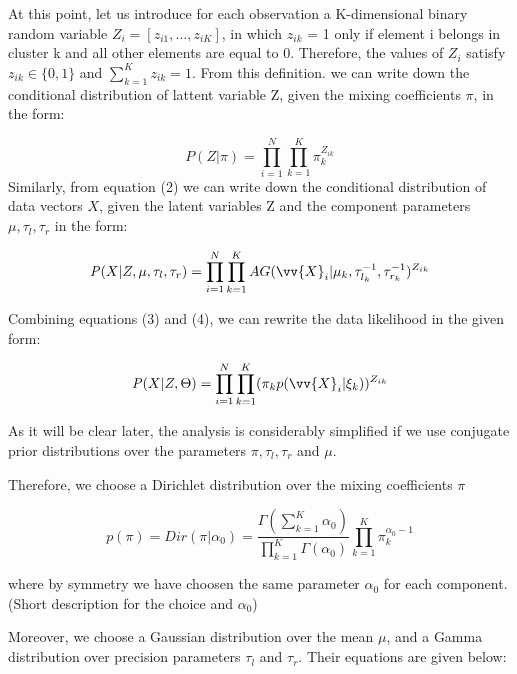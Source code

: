 \documentclass[runningheads]{llncs}
\begin{document}
At this point, let us introduce for each observation a K-dimensional binary random variable $Z_{i} = [z_{i1},\dots,z_{iK}]$,
in which $z_{ik}$ = 1 only if element i belongs in cluster k and all other elements are equal to 0. Therefore, the values of 
$Z_{i}$ satisfy $z_{ik} \in \{0, 1\}$  and $\sum_{k=1}^{K}z_{ik} = 1$. 
From this definition. we can write down the conditional distribution of lattent variable Z, given the mixing
coefficients $\pi$, in the form: 

\begin{equation}
   \mathit{P}(Z|\pi) = \prod_{i=1}^{N}\prod_{k=1}^{K} \pi_{k}^{Z_{ik}} 
\end{equation}
Similarly, from equation (2) we can write down the conditional distribution of data vectors $X$, 
given the latent variables Z and the component parameters $\mu, \tau_l , \tau_r$ in the form: 

\begin{equation}
   \mathit{P}(X| Z, \mu, \tau_l, \tau_r) =\prod_{i=1}^{N}\prod_{k=1}^{K}AG(\vv{X}_{i}|\mu_{k},\tau_{l_k}^{-1},\tau_{r_k}^{-1})^{Z_{ik}}
\end{equation}

Combining equations (3) and (4), we can rewrite the data likelihood in the given form:

\begin{equation}
   \mathit{P}(X| Z,\Theta) = \prod_{i=1}^{N}\prod_{k=1}^{K} (\pi_{k}p(\vv{X}_{i}|\xi_{k}))^{Z_{ik}} 
\end{equation}

As it will be clear later, the analysis is considerably simplified if we use conjugate prior distributions 
over the parameters $\pi,\tau_{l}, \tau_{r}$ and $\mu$.

Therefore, we choose a Dirichlet distribution over the mixing coefficients $\pi$

\begin{equation}
p(\pi)= Dir(\pi|\alpha_0)=  \frac{\Gamma(\sum_{k=1}^{K} \alpha_{0})}{\prod_{k=1}^{K} \Gamma(\alpha_{0})}\prod_{k=1}^{K} \pi_k^{\alpha_0-1}
\end{equation}

where by symmetry we have choosen the same parameter $\alpha_0$ for each component. (Short description for the choice and $\alpha_0$)

Moreover, we choose a Gaussian distribution over the mean $\mu$, 
and a Gamma distribution over precision parameters $\tau_{l}$ and $\tau_{r}$. Their equations are given below:
\end{document}
